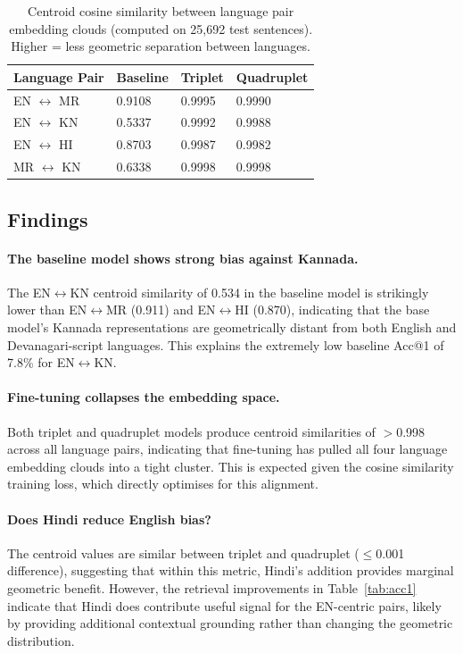 \documentclass[11pt,a4paper]{article}
\makeatletter
\newcommand{\acc}{Acc@1}
\makeatother
\begin{document}
\begin{table}[H]
\centering
\caption{Centroid cosine similarity between language pair embedding clouds
  (computed on 25,692 test sentences).
  Higher = less geometric separation between languages.}
\label{tab:centroid}
\begin{tabular}{l C{2.2cm} C{2.2cm} C{2.2cm}}
\toprule
\textbf{Language Pair} & \textbf{Baseline} & \textbf{Triplet} & \textbf{Quadruplet} \\
\midrule
EN $\leftrightarrow$ MR & 0.9108 & 0.9995 & 0.9990 \\
EN $\leftrightarrow$ KN & 0.5337 & 0.9992 & 0.9988 \\
EN $\leftrightarrow$ HI & 0.8703 & 0.9987 & 0.9982 \\
MR $\leftrightarrow$ KN & 0.6338 & 0.9998 & 0.9998 \\
\bottomrule
\end{tabular}
\end{table}

\subsection{Findings}

\paragraph{The baseline model shows strong bias against Kannada.}
The EN$\leftrightarrow$KN centroid similarity of 0.534 in the
baseline model is strikingly lower than EN$\leftrightarrow$MR
(0.911) and EN$\leftrightarrow$HI (0.870), indicating that
the base model's Kannada representations are geometrically
distant from both English and Devanagari-script languages.
This explains the extremely low baseline \acc{} of 7.8\%
for EN$\leftrightarrow$KN.

\paragraph{Fine-tuning collapses the embedding space.}
Both triplet and quadruplet models produce centroid similarities
of $>$0.998 across all language pairs, indicating that
fine-tuning has pulled all four language embedding clouds
into a tight cluster.
This is expected given the cosine similarity training loss,
which directly optimises for this alignment.

\paragraph{Does Hindi reduce English bias?}
The centroid values are similar between triplet and quadruplet
($\leq$0.001 difference), suggesting that within this metric,
Hindi's addition provides marginal geometric benefit.
However, the retrieval improvements in Table~\ref{tab:acc1}
indicate that Hindi does contribute useful signal for the EN-centric
pairs, likely by providing additional contextual grounding
rather than changing the geometric distribution.
\end{document}
